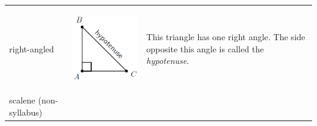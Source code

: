 \begin{center}
\begin{xtabular*}{\mytablewidth}[t]{|p{10\mystarwidth}|p{10\mystarwidth}|p{10\mystarwidth}|}
     \tabularnewline{}
        right-angled &
    \setcounter{subfigure}{0}
\label{m39368*id317628}
    \begin{center}
    \label{m39368*id317628!!!underscore!!!media}\label{m39368*id317628!!!underscore!!!printimage}\includegraphics{col11306.imgs/m39368_MG10C13_025.png} %
      \vspace{2pt}
    \vspace{.1in}
    \end{center}    
                 &
        This triangle has one right angle. The side opposite this angle is called the \textsl{hypotenuse}.%
     \tabularnewline{}
        scalene (non-syllabus) &
    \setcounter{subfigure}{0}
\label{m39368*id317668}
    \begin{center}

\end{center}
\end{xtabular*}
\end{center}
